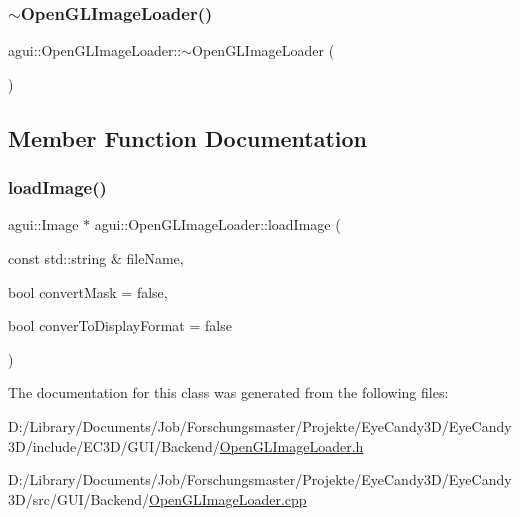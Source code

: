 \subsubsection{\texorpdfstring{$\sim$\+Open\+G\+L\+Image\+Loader()}{~OpenGLImageLoader()}}
{\footnotesize\ttfamily agui\+::\+Open\+G\+L\+Image\+Loader\+::$\sim$\+Open\+G\+L\+Image\+Loader (\begin{DoxyParamCaption}{ }\end{DoxyParamCaption})\hspace{0.3cm}{\ttfamily [virtual]}}



\subsection{Member Function Documentation}
\mbox{\label{classagui_1_1_open_g_l_image_loader_a8a72a6652077e5302924b541ba3d2cef}} 
\subsubsection{\texorpdfstring{load\+Image()}{loadImage()}}
{\footnotesize\ttfamily agui\+::\+Image $\ast$ agui\+::\+Open\+G\+L\+Image\+Loader\+::load\+Image (\begin{DoxyParamCaption}\item[{const std\+::string \&}]{file\+Name,  }\item[{bool}]{convert\+Mask = {\ttfamily false},  }\item[{bool}]{conver\+To\+Display\+Format = {\ttfamily false} }\end{DoxyParamCaption})\hspace{0.3cm}{\ttfamily [virtual]}}



The documentation for this class was generated from the following files\+:\begin{DoxyCompactItemize}
\item 
D\+:/\+Library/\+Documents/\+Job/\+Forschungsmaster/\+Projekte/\+Eye\+Candy3\+D/\+Eye\+Candy3\+D/include/\+E\+C3\+D/\+G\+U\+I/\+Backend/\mbox{\hyperlink{_open_g_l_image_loader_8h}{Open\+G\+L\+Image\+Loader.\+h}}\item 
D\+:/\+Library/\+Documents/\+Job/\+Forschungsmaster/\+Projekte/\+Eye\+Candy3\+D/\+Eye\+Candy3\+D/src/\+G\+U\+I/\+Backend/\mbox{\hyperlink{_open_g_l_image_loader_8cpp}{Open\+G\+L\+Image\+Loader.\+cpp}}\end{DoxyCompactItemize}
